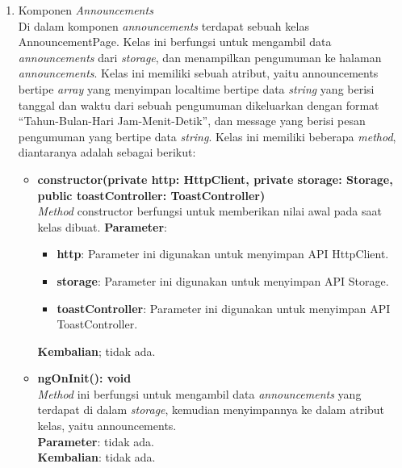 \begin{enumerate}
	\item Komponen \textit{Announcements} \\
	Di dalam komponen \textit{announcements} terdapat sebuah kelas AnnouncementPage. Kelas ini berfungsi untuk mengambil data \textit{announcements} 	dari \textit{storage}, dan menampilkan pengumuman ke halaman \textit{announcements}. Kelas ini memiliki sebuah atribut, yaitu announcements bertipe \textit{array} yang menyimpan localtime bertipe data \textit{string} yang berisi tanggal dan waktu dari sebuah pengumuman dikeluarkan dengan format ``Tahun-Bulan-Hari Jam-Menit-Detik'', dan message yang berisi pesan pengumuman yang bertipe data \textit{string}. 
	Kelas ini memiliki beberapa \textit{method}, diantaranya adalah sebagai berikut:
	
	\begin{itemize}
		\item \textbf{constructor(private http: HttpClient, private storage: Storage, public toastController: ToastController)}\\
		\textit{Method} constructor berfungsi untuk memberikan nilai awal pada saat kelas dibuat.
		\textbf{Parameter}: 
		\begin{itemize}
			\item \textbf{http}: Parameter ini digunakan untuk menyimpan API HttpClient.
			\item \textbf{storage}: Parameter ini digunakan untuk menyimpan API Storage.
			\item \textbf{toastController}: Parameter ini digunakan untuk menyimpan API ToastController.
		\end{itemize}
		\textbf{Kembalian}; tidak ada.
		
		\item \textbf{ngOnInit(): void}\\
		\textit{Method} ini berfungsi untuk mengambil data \textit{announcements} yang terdapat di dalam \textit{storage}, kemudian menyimpannya ke dalam atribut kelas, yaitu announcements. \\
		\textbf{Parameter}: tidak ada. \\
		\textbf{Kembalian}: tidak ada.
		
		\newpage		
		

\end{itemize}
\end{enumerate}
